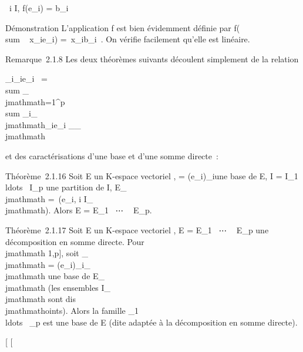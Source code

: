 \documentclass[]{article}
\begin{document}
\forall~i \in I, f(e_i) = b_i~

Démonstration L'application f est bien évidemment définie par
f(\\sum ~
x_ie_i) =\
\sum  x_ib_i~. On vérifie
facilement qu'elle est linéaire.

Remarque~2.1.8 Les deux théorèmes suivants découlent simplement de la
relation

\sum _i\inI\alpha_ie_i~ =
\\sum
_\\jmathmath=1^p\underbrace
\\sum
_i\inI_\\jmathmath\alpha_ie_i _\inE_\\jmathmath

et des caractérisations d'une base et d'une somme directe~:

Théorème~2.1.16 Soit E un K-espace vectoriel ,  =
(e_i)_i\inI une base de E, I = I_1
\cup\\ldots~ \cup
I_p une partition de I, E_\\jmathmath =\
\mathrmVect(e_i, i \in I_\\jmathmath). Alors
E = E_1 \oplus~⋯ \oplus~ E_p.

Théorème~2.1.17 Soit E un K-espace vectoriel , E = E_1
\oplus~⋯ \oplus~ E_p une décomposition en somme
directe. Pour \\jmathmath \in {[}1,p{]}, soit _\\jmathmath =
(e_i)_i\inI_\\jmathmath une base de E_\\jmathmath (les
ensembles I_\\jmathmath sont dis\\jmathmathoints). Alors la famille _1
\cup\\ldots~
\cup\mathcal{E}_p est une base de E (dite adaptée à la décomposition en
somme directe).

{[}
{[}
\end{document}
